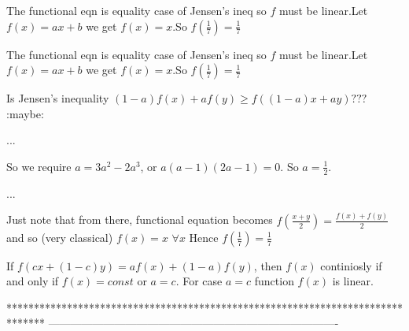 \begin{solution}
	The functional eqn is equality case of Jensen's ineq so $f$ must be linear.Let $f(x)=ax+b$ we get $f(x)=x$.So $f(\frac{1}{7})=\frac {1}{7}$
\end{solution}



\begin{solution}
	\begin{tcolorbox}The functional eqn is equality case of Jensen's ineq so $f$ must be linear.Let $f(x)=ax+b$ we get $f(x)=x$.So $f(\frac{1}{7})=\frac {1}{7}$\end{tcolorbox}

Is Jensen's inequality  $(1-a)f(x)+af(y)\ge f((1-a)x+ay)???$
:maybe:
\end{solution}



\begin{solution}
	\begin{tcolorbox}...

So we require $a=3a^2-2a^3$, or $a(a-1)(2a-1)=0$.  So $a=\frac{1}{2}$.

...\end{tcolorbox}
Just note that from there, functional equation becomes $f(\frac{x+y}2)=\frac{f(x)+f(y)}2$ and so (very classical) $f(x)=x$ $\forall x$
Hence $f(\frac 17)=\frac 17$
\end{solution}



\begin{solution}
	If $f(cx+(1-c)y)=af(x)+(1-a)f(y)$, then $f(x)$ continiosly
if and only if $f(x)=const$ or $a=c$. For case $a=c$ function $f(x)$ is linear.
\end{solution}



*******************************************************************************
-------------------------------------------------------------------------------

